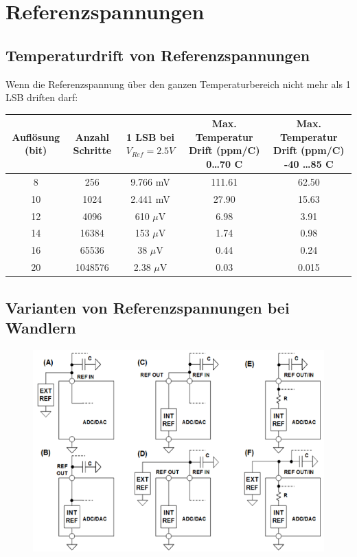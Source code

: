 \section{Referenzspannungen} 

\subsection{Temperaturdrift von Referenzspannungen}
Wenn die Referenzspannung über den ganzen Temperaturbereich nicht mehr als 1 LSB driften darf:

\begin{tabular}{|c|c|c|c|c|}
	\hline
	Auflösung (bit)	& 
	Anzahl Schritte	& 
	1 LSB bei $V_{Ref} = 2.5 V$	& 
	\multicolumn{1}{p{4cm}|}{Max. Temperatur Drift (ppm/\textdegree C) 0\ldots70 \textdegree C} &
	\multicolumn{1}{p{4cm}|}{Max. Temperatur Drift (ppm/\textdegree C) -40 \ldots 85 \textdegree C}
	\\ \hline
	8 	& 256	& 9.766 mV 		& 111.61	& 62.50
	\\ \hline
	10	& 1024	& 2.441 mV		& 27.90		& 15.63
	\\ \hline 
	12	& 4096	& 610 $\mu$V	& 6.98		& 3.91
	\\ \hline
	14	& 16384	& 153 $\mu$V	& 1.74		& 0.98
	\\ \hline
	16	& 65536	& 38 $\mu$V		& 0.44		& 0.24
	\\ \hline
	20	& 1048576	& 2.38 $\mu$V	& 0.03	& 0.015
	\\ \hline 
\end{tabular}


\subsection{Varianten von Referenzspannungen bei Wandlern}
\begin{figure}[!h]
\includegraphics[scale=0.3]{pictures/variantenReferenzspannungen}
\end{figure}


